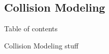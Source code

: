 \subsection{Collision Modeling}
\begin{frame}{Table of contents}
    \tableofcontents[currentsubsection]
\end{frame}

\begin{frame}{Collision Modeling}
    stuff
\end{frame}